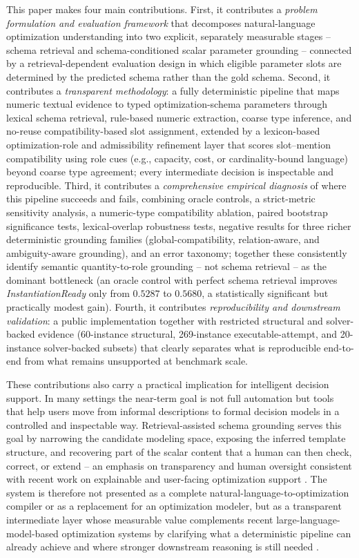 \documentclass[pdflatex,sn-basic,Numbered]{sn-jnl}
\begin{document}
This paper makes four main contributions. First, it contributes a \emph{problem formulation and evaluation framework} that decomposes natural-language optimization understanding into two explicit, separately measurable stages -- schema retrieval and schema-conditioned scalar parameter grounding -- connected by a retrieval-dependent evaluation design in which eligible parameter slots are determined by the predicted schema rather than the gold schema. Second, it contributes a \emph{transparent methodology}: a fully deterministic pipeline that maps numeric textual evidence to typed optimization-schema parameters through lexical schema retrieval, rule-based numeric extraction, coarse type inference, and no-reuse compatibility-based slot assignment, extended by a lexicon-based optimization-role and admissibility refinement layer that scores slot--mention compatibility using role cues (e.g., capacity, cost, or cardinality-bound language) beyond coarse type agreement; every intermediate decision is inspectable and reproducible. Third, it contributes a \emph{comprehensive empirical diagnosis} of where this pipeline succeeds and fails, combining oracle controls, a strict-metric sensitivity analysis, a numeric-type compatibility ablation, paired bootstrap significance tests, lexical-overlap robustness tests, negative results for three richer deterministic grounding families (global-compatibility, relation-aware, and ambiguity-aware grounding), and an error taxonomy; together these consistently identify semantic quantity-to-role grounding -- not schema retrieval -- as the dominant bottleneck (an oracle control with perfect schema retrieval improves \textit{InstantiationReady} only from $0.5287$ to $0.5680$, a statistically significant but practically modest gain). Fourth, it contributes \emph{reproducibility and downstream validation}: a public implementation together with restricted structural and solver-backed evidence (60-instance structural, 269-instance executable-attempt, and 20-instance solver-backed subsets) that clearly separates what is reproducible end-to-end from what remains unsupported at benchmark scale.

These contributions also carry a practical implication for intelligent decision support. In many settings the near-term goal is not full automation but tools that help users move from informal descriptions to formal decision models in a controlled and inspectable way. Retrieval-assisted schema grounding serves this goal by narrowing the candidate modeling space, exposing the inferred template structure, and recovering part of the scalar content that a human can then check, correct, or extend -- an emphasis on transparency and human oversight consistent with recent work on explainable and user-facing optimization support \cite{biemans2025explainableoptimization,powell2025scheduling_explanations}. The system is therefore not presented as a complete natural-language-to-optimization compiler or as a replacement for an optimization modeler, but as a transparent intermediate layer whose measurable value complements recent large-language-model-based optimization systems by clarifying what a deterministic pipeline can already achieve and where stronger downstream reasoning is still needed \cite{ahmaditeshnizi2024optimus_icml,zhang2024optllm,ahmed2025opt2code}.
\end{document}
